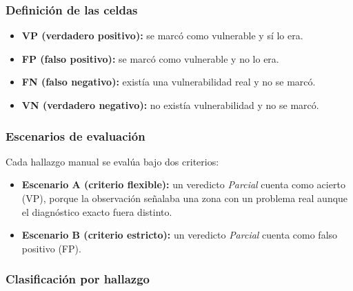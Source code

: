 \documentclass[11pt,letterpaper]{article}
\begin{document}
\subsubsection{Definición de las celdas}
\begin{itemize}
  \item \textbf{VP (verdadero positivo):} se marcó como vulnerable y sí lo era.
  \item \textbf{FP (falso positivo):} se marcó como vulnerable y no lo era.
  \item \textbf{FN (falso negativo):} existía una vulnerabilidad real y no se marcó.
  \item \textbf{VN (verdadero negativo):} no existía vulnerabilidad y no se marcó.
\end{itemize}

\subsubsection{Escenarios de evaluación}
Cada hallazgo manual se evalúa bajo dos criterios:
\begin{itemize}
  \item \textbf{Escenario A (criterio flexible):} un veredicto \textit{Parcial} cuenta como acierto (VP), porque la observación señalaba una zona con un problema real aunque el diagnóstico exacto fuera distinto.
  \item \textbf{Escenario B (criterio estricto):} un veredicto \textit{Parcial} cuenta como falso positivo (FP).
\end{itemize}

\subsubsection{Clasificación por hallazgo}
\end{document}
